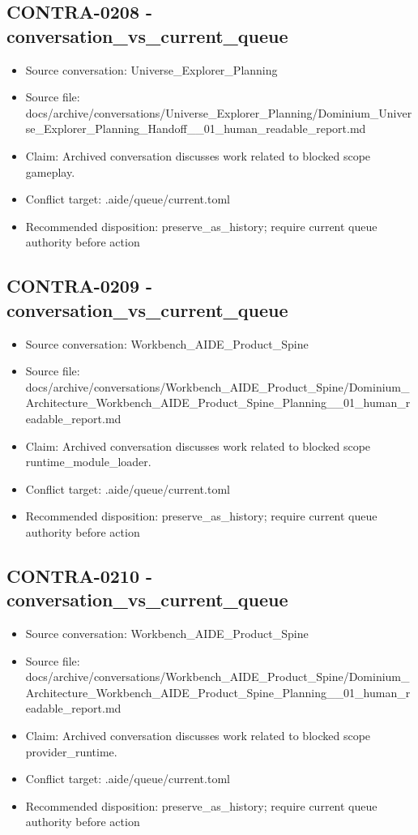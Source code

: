 \documentclass[11pt,a4paper]{report}
\begin{document}
\subsection{CONTRA-0208 - conversation\_vs\_current\_queue}

\begin{itemize}
\item Source conversation: Universe\_Explorer\_Planning
\item Source file: docs/archive/conversations/Universe\_Explorer\_Planning/Dominium\_Universe\_Explorer\_Planning\_Handoff\_\_01\_human\_readable\_report.md
\item Claim: Archived conversation discusses work related to blocked scope gameplay.
\item Conflict target: .aide/queue/current.toml
\item Recommended disposition: preserve\_as\_history; require current queue authority before action
\end{itemize}

\subsection{CONTRA-0209 - conversation\_vs\_current\_queue}

\begin{itemize}
\item Source conversation: Workbench\_AIDE\_Product\_Spine
\item Source file: docs/archive/conversations/Workbench\_AIDE\_Product\_Spine/Dominium\_Architecture\_Workbench\_AIDE\_Product\_Spine\_Planning\_\_01\_human\_readable\_report.md
\item Claim: Archived conversation discusses work related to blocked scope runtime\_module\_loader.
\item Conflict target: .aide/queue/current.toml
\item Recommended disposition: preserve\_as\_history; require current queue authority before action
\end{itemize}

\subsection{CONTRA-0210 - conversation\_vs\_current\_queue}

\begin{itemize}
\item Source conversation: Workbench\_AIDE\_Product\_Spine
\item Source file: docs/archive/conversations/Workbench\_AIDE\_Product\_Spine/Dominium\_Architecture\_Workbench\_AIDE\_Product\_Spine\_Planning\_\_01\_human\_readable\_report.md
\item Claim: Archived conversation discusses work related to blocked scope provider\_runtime.
\item Conflict target: .aide/queue/current.toml
\item Recommended disposition: preserve\_as\_history; require current queue authority before action
\end{itemize}
\end{document}
